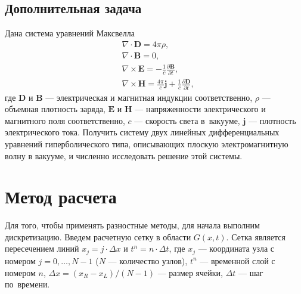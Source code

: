 \documentclass[12pt,a4paper]{article}
\begin{document}
	\subsection{Дополнительная задача}
	Дана система уравнений Максвелла
	\begin{align}
		&\nabla \cdot \mathbf{D} = 4\pi\rho,\label{Maxwell1}\\
		&\nabla \cdot \mathbf{B} = 0,\\
		&\nabla \times \mathbf{E} = -\frac{1}{c}\frac{\partial\mathbf{B}}{\partial t},\\
		&\nabla \times \mathbf{H} = \frac{4\pi}{c}\mathbf{j} + \frac{1}{c}\frac{\partial\mathbf{D}}{\partial t},\label{Maxwell4}
	\end{align}
	где $\mathbf{D}$ и $\mathbf{B}$ --- электрическая и магнитная индукции соответственно, $\rho$ --- объемная плотность заряда, $\mathbf{E}$ и $\mathbf{H}$ --- напряженности электрического и магнитного поля соответственно, $c$ --- скорость света в~вакууме, $\mathbf{j}$ --- плотность электрического тока. Получить систему двух линейных дифференциальных уравнений гиперболического типа, описывающих плоскую электромагнитную волну в вакууме, и численно исследовать решение этой системы.
	
	\section{Метод расчета}
	Для того, чтобы применять разностные методы, для начала выполним дискретизацию. Введем расчетную сетку в области $G(x, t)$. Сетка является пересечением линий $x_j = j\cdot\Delta x$ и $t^n = n\cdot\Delta t$, где $x_j$ --- координата узла с номером $j = 0,\dots,N-1$ ($N$ --- количество узлов), $t^n$ --- временной слой с номером $n$, $\Delta x = (x_R - x_L)/(N - 1)$ --- размер ячейки, $\Delta t$ --- шаг по~времени.
	
\end{document}
